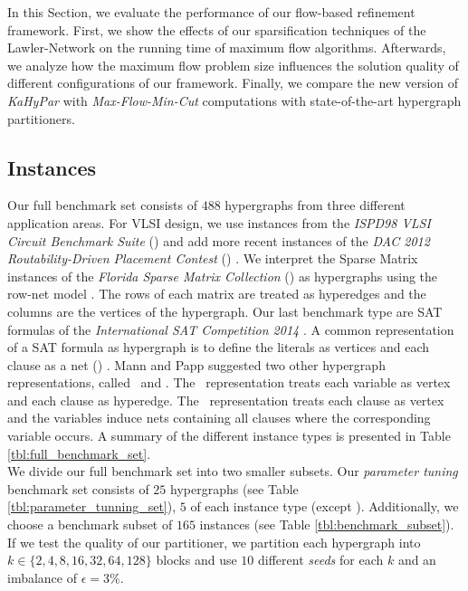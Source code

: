 In this Section, we evaluate the performance of our flow-based refinement framework. 
First, we show the effects of our sparsification techniques of the Lawler-Network 
\cite{lawler1973} on the running time of maximum flow algorithms.
Afterwards, we analyze how the maximum
flow problem size influences the solution quality of different configurations of
our framework. Finally, we compare the new version of \emph{KaHyPar} with
\emph{Max-Flow-Min-Cut} computations with
state-of-the-art hypergraph partitioners.


\subsection{Instances}

Our full benchmark set consists of $488$ hypergraphs from three different 
application areas. For VLSI design, we use instances from
the \emph{ISPD98 VLSI Circuit Benchmark Suite} (\ISPD) \cite{alpert1998ispd98} and add more recent
instances of the \emph{DAC 2012 Routability-Driven Placement Contest} (\DAC) \cite{viswanathan2012dac}.
We interpret the Sparse Matrix instances of the \emph{Florida Sparse Matrix 
Collection} (\SPM) \cite{davis2011university} as hypergraphs using the row-net model \cite{catalyurek1999hypergraph}.
The rows of each matrix are treated as hyperedges and the columns are the vertices of
the hypergraph. Our last benchmark type are SAT formulas of the \emph{International SAT
Competition 2014} \cite{belov2014application}. A common representation of a SAT formula 
as hypergraph is to define the literals as vertices and each clause as a net (\Literal) \cite{papa2007hypergraph}.
Mann and Papp \cite{mann2014formula} suggested two other hypergraph representations, 
called \Primal~and \Dual. The \Primal~representation treats each variable
as vertex and each clause as hyperedge. The \Dual~representation treats each clause as
vertex and the variables induce nets containing all clauses where the corresponding
variable occurs. A summary of the different instance types is presented in
Table \ref{tbl:full_benchmark_set}. \\
We divide our full benchmark set into two smaller subsets. Our \emph{parameter tuning}
benchmark set consists of $25$ hypergraphs (see Table \ref{tbl:parameter_tunning_set}), $5$ of each instance type (except \DAC). Additionally,
we choose a benchmark subset of $165$ instances (see Table \ref{tbl:benchmark_subset}). If we test the quality of our partitioner, 
we partition each hypergraph into $k \in \{2,4,8,16,32,64,128\}$ blocks and use $10$ different
\emph{seeds} for each $k$ and an imbalance of $\epsilon = 3\%$.

